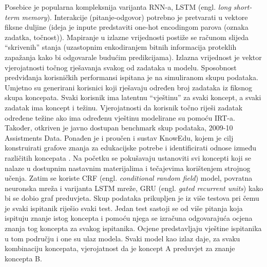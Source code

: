Posebice je popularna kompleksnija varijanta RNN-a, LSTM (engl. \textit{long short-term memory}). Interakcije (pitanje-odgovor) potrebno je pretvarati u vektore fiksne duljine (ideja je inpute predstaviti one-hot encodingom parova (oznaka zadatka, točnost)). Mapiranje u izlazne vrijednosti postiže se računom slijeda “skrivenih” stanja (uzastopnim enkodiranjem bitnih informacija proteklih zapažanja kako bi odgovarale budućim predikcijama). Izlazna vrijednost je vektor vjerojatnosti točnog rješavanja svakog od zadataka u modelu. 
Sposobnost predviđanja korisničkih performansi ispitana je na simuliranom skupu podataka. Umjetno su generirani korisnici koji rješavaju određen broj zadataka iz fiksnog skupa koncepata. Svaki korisnik ima latentnu “vještinu” za svaki koncept, a svaki zadatak ima koncept i težinu. Vjerojatnosti da korisnik točno riješi zadatak određene težine ako ima određenu vještinu modelirane su pomoću IRT-a. Također, otkriven je javno dostupan benchmark skup podataka, 2009-10 Assistments Data.
\newline
\newline
Ponađen je i proučen i sustav KnowEdu, kojem je cilj konstruirati grafove znanja za edukacijske potrebe i identificirati odnose između različitih koncepata \citep{knowedu}.\newline
Na početku se pokušavaju ustanoviti svi koncepti koji se nalaze u dostupnim nastavnim materijalima i tečajevima korištenjem strojnog učenja. Zatim se koriste CRF (engl. \textit{conditional random field}) model, povratna neuronska mreža i varijanta LSTM mreže, GRU (engl. \textit{gated recurrent units}) kako bi se dobio graf preduvjeta. Skup podataka prikupljen je iz više testova pri čemu je svaki ispitanik riješio svaki test. Jedan test sastoji se od više pitanja koja ispituju znanje istog koncepta i pomoću njega se izračuna odgovarajuća ocjena znanja tog koncepta za svakog ispitanika. Ocjene predstavljaju vještine ispitanika u tom području i one su ulaz modela. Svaki model kao izlaz daje, za svaku kombinaciju koncepata, vjerojatnost da je koncept A preduvjet za znanje koncepta B.